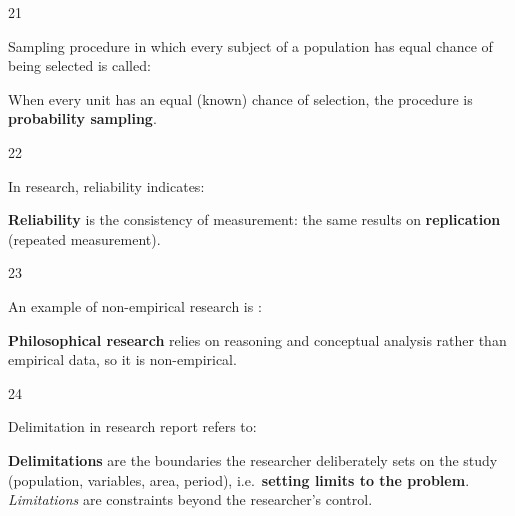 \begin{question}{21}
{Sampling procedure in which every subject of a population has equal chance of being selected is called:\par}
\begin{explain}
When every unit has an equal (known) chance of selection, the procedure is \textbf{probability sampling}.
\end{explain}
\end{question}

\begin{question}{22}
{In research, reliability indicates:\par}
\begin{explain}
\textbf{Reliability} is the consistency of measurement: the same results on \textbf{replication} (repeated measurement).
\end{explain}
\end{question}

\begin{question}{23}
{An example of non-empirical research is :\par}
\begin{explain}
\textbf{Philosophical research} relies on reasoning and conceptual analysis rather than empirical data, so it is non-empirical.
\end{explain}
\end{question}

\begin{question}{24}
{Delimitation in research report refers to:\par}
\begin{explain}
\textbf{Delimitations} are the boundaries the researcher deliberately sets on the study (population, variables, area, period), i.e.\ \textbf{setting limits to the problem}. \emph{Limitations} are constraints beyond the researcher's control.
\end{explain}
\end{question}

